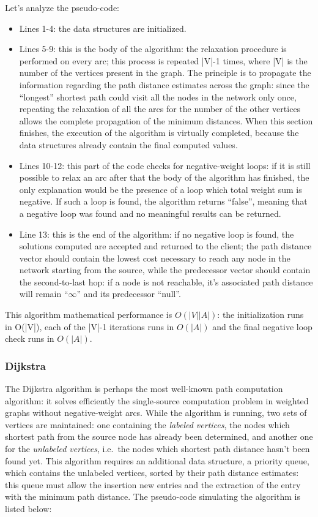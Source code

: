 \documentclass[10pt,a4paper]{report}
\begin{document}
Let's analyze the pseudo-code:
\begin{itemize}
\item Lines 1-4: the data structures are initialized.
\item Lines 5-9: this is the body of the algorithm: the relaxation
  procedure is performed on every arc; this process is repeated |V|-1
  times, where |V| is the number of the vertices present in the
  graph. The principle is to propagate the information regarding the
  path distance estimates across the graph: since the ``longest''
  shortest path could visit all the nodes in the network only once,
  repeating the relaxation of all the arcs for the number of the other
  vertices allows the complete propagation of the minimum
  distances. When this section finishes, the execution of the
  algorithm is virtually completed, because the data structures
  already contain the final computed values.
\item Lines 10-12: this part of the code checks for negative-weight
  loops: if it is still possible to relax an arc after that the body
  of the algorithm has finished, the only explanation would be the
  presence of a loop which total weight sum is negative. If such a
  loop is found, the algorithm returns ``false'', meaning that a
  negative loop was found and no meaningful results can be returned.
\item Line 13: this is the end of the algorithm: if no negative loop
  is found, the solutions computed are accepted and returned to the
  client; the path distance vector should contain the lowest cost
  necessary to reach any node in the network starting from the source,
  while the predecessor vector should contain the second-to-last hop:
  if a node is not reachable, it's associated path distance will
  remain ``\(\infty\)'' and its predecessor ``null''.
\end{itemize}

This algorithm mathematical performance is \(O(|V||A|)\): the
initialization runs in O(|V|), each of the |V|-1 iterations runs in
\(O(|A|)\) and the final negative loop check runs in \(O(|A|)\).

\subsubsection{Dijkstra}

The Dijkstra algorithm is perhaps the most well-known path computation
algorithm: it solves efficiently the single-source computation problem
in weighted graphs without negative-weight arcs. While the algorithm
is running, two sets of vertices are maintained: one containing the
\textit{labeled vertices}, the nodes which shortest path from the
source node has already been determined, and another one for the
\textit{unlabeled vertices}, i.e.\ the nodes which shortest path
distance hasn't been found yet. This algorithm requires an additional
data structure, a priority queue, which contains the unlabeled
vertices, sorted by their path distance estimates: this queue must
allow the insertion new entries and the extraction of the entry with
the minimum path distance. The pseudo-code simulating the algorithm is
listed below:
\end{document}
